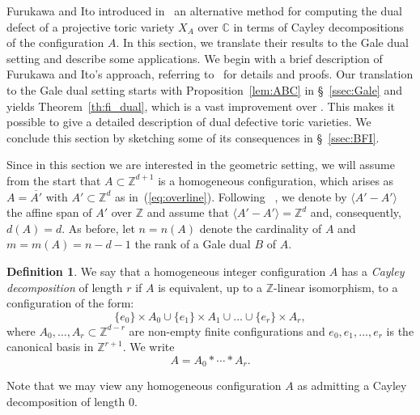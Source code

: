 \documentclass[11pt]{amsart}
\theoremstyle{plain}
\theoremstyle{definition}
\newtheorem{definition}[theorem]{Definition}
\theoremstyle{remark}
\newcommand{\baseRing}[1]{\ensuremath{\mathbb{#1}}}
\newcommand{\Z}{\baseRing{Z}}
\newcommand{\C}{\baseRing{C}}
\newcommand{\eeq}{\end{equation}}
\numberwithin{equation}{section}
\begin{document}
 

Furukawa and Ito  introduced in~\cite{FI}
an alternative method for computing the dual defect of a projective toric variety $X_A$ over $\C$
in terms of Cayley decompositions of the configuration $A$. In this section, we translate their
results to the Gale dual setting and describe some applications.
We begin with a brief description of  Furukawa and Ito's approach, referring to~\cite{FI} for details and proofs.   Our translation
to the Gale dual setting starts with Proposition~\ref{lem:ABC} in \S~\ref{ssec:Gale} and yields
Theorem~\ref{th:fi_dual}, which is a vast improvement over \cite[Theorem~25]{CC}. 
This makes it possible to give a detailed description of dual defective toric varieties.
We conclude this section by sketching some of its consequences in \S~\ref{ssec:BFI}.


\medskip


Since in this section we are interested in the geometric setting, we will assume from the start that 
$A \subset  \Z^{d+1}$ is a homogeneous configuration, which arises as $A = \overline{A'}$ with
$A'\subset \Z^d$ as in~(\ref{eq:overline}).
Following ~\cite{FI}, we denote by $\langle A' - A'\rangle$ the affine span of $A'$ over $\Z$ and 
assume that $\langle A' - A'\rangle=\Z^d$ and, consequently, $d(A) = d$.
As before, let $n = n(A)$ denote the cardinality of $A$ and $m = m(A) = n - d - 1$ the rank of a Gale dual $B$ of $A$.  





\begin{definition}\label{def:cayley}
We say that a homogeneous integer configuration $A$ has a {\em Cayley decomposition} of length $r$ if $A$ is  equivalent, up to a $\Z$-linear isomorphism, to a configuration of the form:  
\begin{equation}\label{eq:Cayley}
 \{e_0\} \times A_0 \cup \{e_1\} \times A_1 \cup \dots \cup
\{e_r\} \times A_r,
\end{equation}
where 
$A_0,\dots,A_r \subset \Z^{d-r}$ are non-empty finite configurations and $e_0, e_1, \dots, e_r$ is the canonical basis in $\Z^{r+1}$. We write
\begin{equation}\label{eq:Cayley_notation}
A = A_0 \ast \cdots \ast A_r.
\eeq
\end{definition}
Note that we may view any homogeneous configuration $A$ as admitting a Cayley decomposition of length $0$.
\end{document}
